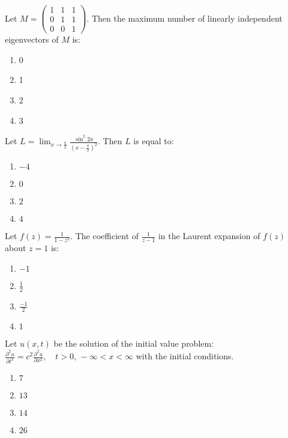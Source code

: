 \iffalse
\chapter{2007}
\author{EE24BTECH11004}
\section{xe}
\fi

    \item Let $ M = \begin{pmatrix} 1 & 1 & 1 \\ 0 & 1 & 1 \\ 0 & 0 & 1 \end{pmatrix} $.
    Then the maximum number of linearly independent eigenvectors of $ M $ is:
    \begin{enumerate}
        \item 0
        \item 1
        \item 2
        \item 3
    \end{enumerate}
\item Let $ L = \lim_{x \to \frac{\pi}{2}} \frac{\sin^2 2x}{\left( x - \frac{\pi}{2} \right)^2} $.
    Then $ L $ is equal to:
    \begin{enumerate}
        \item $-4$
        \item $0$
        \item $2$
        \item $4$
    \end{enumerate}
\item Let $ f(z) = \frac{1}{1 - z^2} $.
The coefficient of $ \frac{1}{z - 1} $ in the Laurent expansion of $ f(z) $ about $ z = 1 $ is:
\begin{enumerate}
        \item $-1$
        \item $\frac{1}{2}$
        \item $\frac{-1}{2}$
        \item $1$
    \end{enumerate}
\item Let $ u(x,t) $ be the solution of the initial value problem:
$ \frac{\partial^2 u}{\partial t^2} = c^2 \frac{\partial^2 u}{\partial x^2}, \quad t > 0, \, -\infty < x < \infty $
with the initial conditions.
\begin{enumerate}
        \item $7$
        \item $13$
        \item $14$
        \item $26$
    \end{enumerate}

